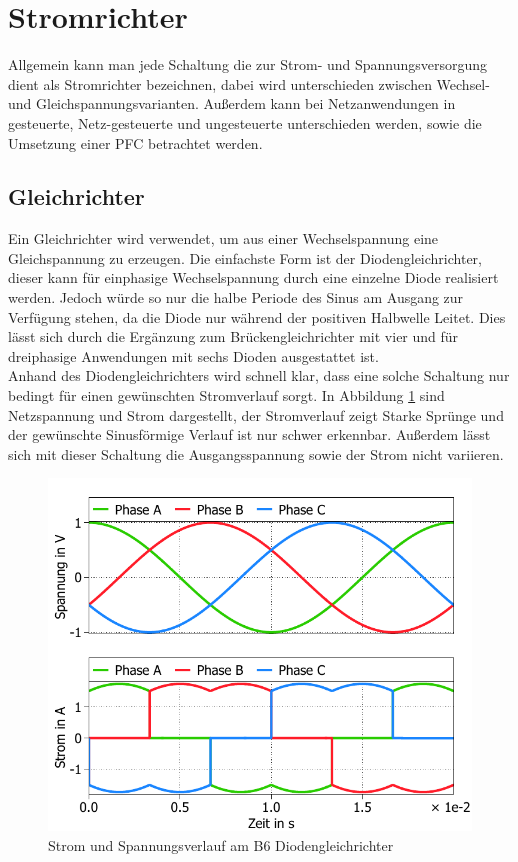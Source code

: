 \section{Stromrichter}
\label{sec:Stromrichter}
Allgemein kann man jede Schaltung die zur Strom- und Spannungsversorgung dient als Stromrichter bezeichnen, dabei wird unterschieden zwischen Wechsel- und Gleichspannungsvarianten. Außerdem kann bei Netzanwendungen in gesteuerte, Netz-gesteuerte und ungesteuerte unterschieden werden, sowie die Umsetzung einer \gls{PFC} betrachtet werden. 
		\subsection{Gleichrichter}
		Ein Gleichrichter wird verwendet, um aus einer Wechselspannung eine Gleichspannung zu erzeugen. Die einfachste Form ist der Diodengleichrichter, dieser kann für einphasige Wechselspannung durch eine einzelne Diode realisiert werden. Jedoch würde so nur die halbe Periode des Sinus am Ausgang zur Verfügung stehen, da die Diode nur während der positiven Halbwelle Leitet. Dies lässt sich durch die Ergänzung zum Brückengleichrichter mit vier und für dreiphasige Anwendungen mit sechs Dioden ausgestattet ist.\\
		Anhand des Diodengleichrichters wird schnell klar, dass eine solche Schaltung nur bedingt für einen gewünschten Stromverlauf sorgt. In Abbildung \ref{B6DiodRect} sind Netzspannung und Strom dargestellt, der Stromverlauf zeigt Starke Sprünge und der gewünschte Sinusförmige Verlauf ist nur schwer erkennbar. Außerdem lässt sich mit dieser Schaltung die Ausgangsspannung sowie der Strom nicht variieren.
		\begin{figure}[H]
			\centering
			\includegraphics[width=0.7\linewidth]{content/Grafiken/B6-Diodengleichrichter-Eingangsverlauf}
			\caption{Strom und Spannungsverlauf am B6 Diodengleichrichter}
			\label{B6DiodRect}
		\end{figure}
		

